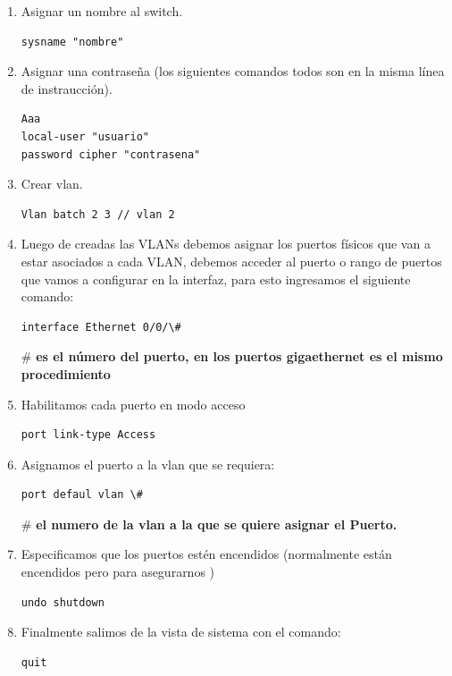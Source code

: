 \documentclass[journal]{IEEEtran}
\begin{document}
\begin{enumerate}
	\item Asignar un nombre al switch.
	\begin{lstlisting}[frame=single]
sysname "nombre"
	\end{lstlisting}
	
	\item Asignar una contraseña (los siguientes comandos todos son en la misma línea de instraucción). 
	\begin{lstlisting}[frame=single]
Aaa
local-user "usuario" 
password cipher "contrasena"
	\end{lstlisting}
	
	\item Crear vlan.
	\begin{lstlisting}[frame=single]
Vlan batch 2 3 // vlan 2 
	\end{lstlisting}
	
	\item Luego de creadas las VLANs debemos asignar los puertos físicos que van a estar asociados a cada VLAN, debemos acceder al puerto o rango de puertos que vamos a configurar en la interfaz, para esto ingresamos el siguiente comando:
	\begin{lstlisting}[frame=single]
interface Ethernet 0/0/\# 
	\end{lstlisting}
	
	\#  \textbf{es el número del puerto, en los puertos gigaethernet es el mismo procedimiento}
	\item Habilitamos cada puerto en modo acceso
	\begin{lstlisting}[frame=single]
port link-type Access
	\end{lstlisting}
	
	\item Asignamos el puerto a la vlan que se requiera:
	\begin{lstlisting}[frame=single]
port defaul vlan \#
	\end{lstlisting}
	
	\# \textbf{el numero de la vlan a la que se quiere asignar el Puerto.}
	
	\item Especificamos que los puertos estén encendidos (normalmente están encendidos pero para asegurarnos )
	\begin{lstlisting}[frame=single]
undo shutdown
	\end{lstlisting}
	
	\item Finalmente salimos de la vista de sistema con el comando:
	\begin{lstlisting}[frame=single]
quit
	\end{lstlisting}
	

\end{enumerate}
\end{document}
